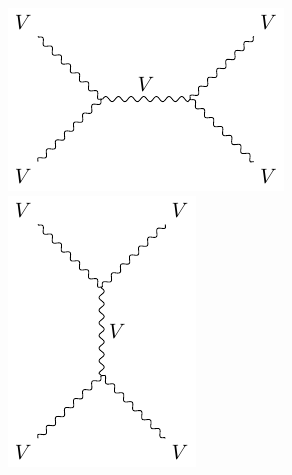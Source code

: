 \begin{figure}[!ht]
  \centering
  \begin{minipage}{0.23\textwidth}
    \includegraphics[width=\textwidth]{figures/feyn_vbs_2.pdf}
  \end{minipage}%
  \begin{minipage}{0.18\textwidth}
    \includegraphics[width=\textwidth]{figures/feyn_vbs_4.pdf}

\end{minipage}
\end{figure}
